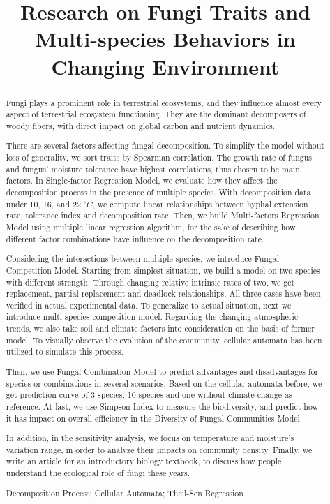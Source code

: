 \documentclass{mcmthesis}
\title{Research on Fungi Traits and Multi-species Behaviors in Changing Environment}
\begin{document}
\begin{abstract}
  
  Fungi plays a prominent role in terrestrial ecosystems, and they influence almost every aspect of terrestrial ecosystem functioning. They are the dominant decomposers of woody fibers, with direct impact on global carbon and nutrient dynamics.

  There are several factors affecting fungal decomposition. To simplify the model without loss of generality, we sort traits by Spearman correlation. The growth rate of fungus and fungus' moisture tolerance have highest correlations, thus chosen to be main factors. In Single-factor Regression Model, we evaluate how they affect the decomposition process in the presence of multiple species. With decomposition data under 10, 16, and 22 $^\circ C$, we compute linear relationships between hyphal extension rate, tolerance index and decomposition rate. Then, we build Multi-factors Regression Model using multiple linear regression algorithm, for the sake of describing how different factor combinations have influence on the decomposition rate. 
  
  Considering the interactions between multiple species, we introduce Fungal Competition Model. Starting from simplest situation, we build a model on two species with different strength. Through changing relative intrinsic rates of two, we get replacement, partial replacement and deadlock relationships. All three cases have been verified in actual experimental data. To generalize to actual situation, next we introduce multi-species competition model. Regarding the changing atmospheric trends, we also take soil and climate factors into consideration on the basis of former model. To visually observe the evolution of the community, cellular automata has been utilized to simulate this process.
  
  Then, we use Fungal Combination Model to predict advantages and disadvantages for species or combinations in several scenarios. Based on the cellular automata before, we get prediction curve of 3 species, 10 species and one without climate change as reference. At last, we use Simpson Index to measure the biodiversity, and predict how it has impact on overall efficiency in the Diversity of Fungal Communities Model.
  
  In addition, in the sensitivity analysis, we focus on temperature and moisture's variation range, in order to analyze their impacts on community density. Finally, we write an article for an introductory biology textbook, to discuss how people understand the ecological role of fungi these years. 

\begin{keywords}
  Decomposition Process; Cellular Automata; Theil-Sen Regression
\end{keywords}
\end{abstract}
\maketitle
\tableofcontents
\end{document}
